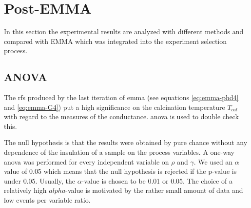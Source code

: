\section{Post-EMMA}
\label{sec:res-post-emma}
In this section the experimental results are analyzed with different methods and compared with EMMA which was integrated into the experiment selection process. 
\subsection{ANOVA}\label{sec:res-anova}
The \gls{rf}s produced by the last iteration of \gls{emma} (see equations \ref{eq:emma-phd4} and \ref{eq:emma-G4}) put a high significance
on the calcination temperature $T_{cal}$ with regard to the 
measures of the conductance. 
\Gls{anova} is used to double check this. 

The null hypothesis is that the results were obtained by pure chance without any dependence of the insulation of a sample on the process variables.
A one-way \gls{anova} was performed for every independent variable on $\rho$ and $\gamma$. 
We used an $\alpha$ value of 0.05 which means that 
the null hypothesis is rejected if the p-value is under 0.05. 
Usually, the $\alpha$-value is chosen to be 0.01 or 0.05\cite{hoffman2020concept,sellke2001pvalues}.
The choice of a relatively high $alpha$-value is motivated by the rather small amount of data and low events per variable ratio.
%

